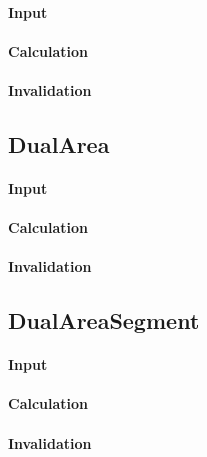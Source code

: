 \paragraph{Input}

\paragraph{Calculation}

\paragraph{Invalidation}

\bigskip

\subsection{DualArea}

\paragraph{Input}

\paragraph{Calculation}

\paragraph{Invalidation}

\bigskip

\subsection{DualAreaSegment}

\paragraph{Input}

\paragraph{Calculation}

\paragraph{Invalidation}

\bigskip

